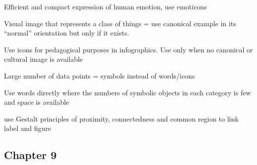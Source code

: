 \begin{compactenum}
\item Efficient and compact expression of human emotion, use emoticons

\item Visual image that represents a class of things = use canonical example
    in its ``normal'' orientation but only if it exists.

\item Use icons for pedagogical purposes in infographics. Use only when no
    canonical or cultural image is available

\item Large number of data points = symbols instead of words/icons

\item Use words directly where the numbers of symbolic objects in each
    category is few and space is available

\item use Gestalt principles of proximity, connectedness and common region to
    link label and figure

\end{compactenum}




\subsection{Chapter 9}


